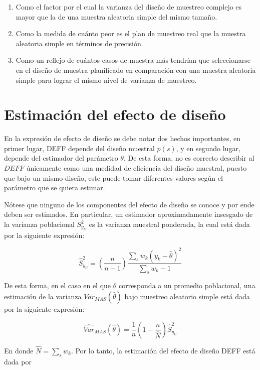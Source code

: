 \documentclass[
  12pt,
]{book}
\providecommand{\tightlist}{%
  \setlength{\itemsep}{0pt}\setlength{\parskip}{0pt}}
\begin{document}
\begin{enumerate}
\def\labelenumi{\arabic{enumi}.}
\tightlist
\item
  Como el factor por el cual la varianza del diseño de muestreo complejo es mayor que la de una muestra aleatoria simple del mismo tamaño.
\item
  Como la medida de cuánto peor es el plan de muestreo real que la muestra aleatoria simple en términos de precisión.
\item
  Como un reflejo de cuántos casos de muestra más tendrían que seleccionarse en el diseño de muestra planificado en comparación con una muestra aleatoria simple para lograr el mismo nivel de varianza de muestreo.
\end{enumerate}

\hypertarget{estimaciuxf3n-del-efecto-de-diseuxf1o}{%
\section{Estimación del efecto de diseño}\label{estimaciuxf3n-del-efecto-de-diseuxf1o}}

En la expresión de efecto de diseño se debe notar dos hechos importantes, en primer lugar, DEFF depende del diseño muestral \(p(s)\), y en segundo lugar, depende del estimador del parámetro \(\theta\). De esta forma, no es correcto describir al \(DEFF\) únicamente como una medidad de eficiencia del diseño muestral, puesto que bajo un mismo diseño, este puede tomar diferentes valores según el parámetro que se quiera estimar.

Nótese que ninguno de los componentes del efecto de diseño se conoce y por ende deben ser estimados. En particular, un estimador aproximadamente insesgado de la varianza poblacional \(S^2_{y_U}\) es la varianza muestral ponderada, la cual está dada por la siguiente expresión:

\[
\hat{S}^2_{y_U} = \left(\frac{n}{n-1}\right)
\frac{\sum_s{ w_k ( y_k - \hat{\theta})^2}}{\sum_s{w_k} -1 }
\]

De esta forma, en el caso en el que \(\theta\) corresponda a un promedio poblacional, una estimación de la varianza \({Var}_{MAS}(\hat{\theta})\) bajo muestreo aleatorio simple está dada por la siguiente expresión:

\[
\widehat{Var}_{MAS}(\hat{\theta}) = \frac{1}{n} \left(1-\frac{n}{\hat N}\right)  \hat{S}^2_{y_U}
\]

En donde \(\hat N = \sum_s w_k\). Por lo tanto, la estimación del efecto de diseño DEFF está dada por
\end{document}
